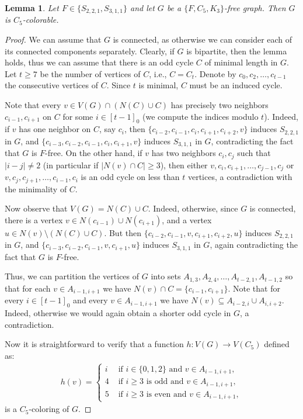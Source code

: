 \documentclass[11pt,a4paper]{article}
\theoremstyle{mystyle}
\newtheorem{lemma}[theorem]{Lemma}
\begin{document}
\begin{lemma}\label{lem:sttt-finite}
Let $F \in \{S_{2,2,1},S_{3,1,1}\}$ and let $G$ be a $\{F,C_5,K_3\}$-free graph. Then $G$ is $C_5$-colorable.
\end{lemma}
\begin{proof}
We can assume that $G$ is connected, as otherwise we can consider each of its connected components separately.
Clearly, if $G$ is bipartite, then the lemma holds, thus we can assume that there is an odd cycle $C$ of minimal length in $G$. Let $t \geq 7$ be the number of vertices of $C$, i.e., $C=C_t$. Denote by $c_0,c_2,\ldots,c_{t-1}$ the consecutive vertices of $C$. Since $t$ is minimal, $C$ must be an induced cycle.

Note that every $v \in V(G) \cap (N(C) \cup C)$ has precisely two neighbors $c_{i-1},c_{i+1}$ on $C$ for some $i \in [t-1]_0$ (we compute the indices modulo $t$). Indeed, if $v$ has one neighbor on $C$, say $c_i$, then $\{c_{i-2},c_{i-1},c_i,c_{i+1},c_{i+2},v\}$ induces $S_{2,2,1}$ in $G$, and $\{c_{i-3},c_{i-2},c_{i-1},c_i,c_{i+1},v\}$ induces $S_{3,1,1}$ in $G$, contradicting the fact that $G$ is $F$-free.
On the other hand, if $v$ has two neighbors $c_i,c_j$ such that $|i-j|\neq 2$ (in particular if $|N(v) \cap C| \geq 3$), then either $v,c_i,c_{i+1},\ldots,c_{j-1},c_j$ or $v,c_j,c_{j+1},\ldots,c_{i-1},c_i$ is an odd cycle on less than $t$ vertices, a contradiction with the minimality of $C$.

Now observe that $V(G)=N(C) \cup C$. Indeed, otherwise, since $G$ is connected, there is a vertex $v \in N(c_{i-1})\cup N(c_{i+1})$, and a vertex $u \in N(v) \setminus (N(C)\cup C)$. But then $\{c_{i-2},c_{i-1},v,c_{i+1},c_{i+2},u\}$ induces $S_{2,2,1}$ in $G$, and $\{c_{i-3},c_{i-2},c_{i-1},v,c_{i+1},u\}$ induces $S_{3,1,1}$ in $G$, again contradicting the fact that $G$ is $F$-free.

Thus, we can partition the vertices of $G$ into sets $A_{1,3},A_{2,4},\ldots,A_{t-2,1},A_{t-1,2}$ so that for each $v \in A_{i-1,i+1}$ we have $N(v) \cap C=\{c_{i-1},c_{i+1}\}$. Note that for every $i \in [t-1]_0$ and every $v \in A_{i-1,i+1}$ we have $N(v) \subseteq A_{i-2,i} \cup A_{i,i+2}$. Indeed, otherwise we would again obtain a shorter odd cycle in $G$, a contradiction.

Now it is straightforward to verify that a function $h:V(G) \to V(C_5)$ defined as:
\begin{align*}
h(v)=\begin{cases}
i & \textrm{ if }i \in \{0,1,2\} \textrm{ and } v \in A_{i-1,i+1}, \\
4  & \textrm{ if }i \geq 3 \textrm{ is odd and } v \in A_{i-1,i+1}, \\
5  & \textrm{ if }i \geq 3 \textrm{ is even and } v \in A_{i-1,i+1},
\end{cases}
\end{align*}
is a $C_5$-coloring of $G$.
\end{proof}
\end{document}
